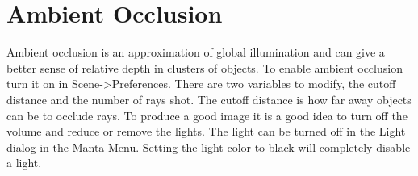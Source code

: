 \section{Ambient Occlusion}
  Ambient occlusion is an approximation of global illumination and can give a better sense of relative depth in clusters of objects.  To enable ambient occlusion turn it on in Scene->Preferences.  There are two variables to modify, the cutoff distance and the number of rays shot.  The cutoff distance is how far away objects can be to occlude rays.  To produce a good image it is a good idea to turn off the volume and reduce or remove the lights.  The light can be turned off in the Light dialog in the Manta Menu.  Setting the light color to black will completely disable a light.
  








